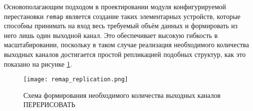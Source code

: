 Основополагающим подходом в проектировании модуля конфигурируемой перестановки \texttt{remap} является создание таких элементарных устройств, которые способны принимать на вход весь требуемый объём данных и формировать из него лишь один выходной канал. Это обеспечивает высокую гибкость в масштабировании, поскольку в таком случае реализация необходимого количества выходных каналов достигается простой репликацией подобных структур, как это показано на рисунке \ref{fig:remap_replication}.\par

\begin{figure}[ht]
    \centering
    \texttt{[image: remap\_replication.png]}
    \caption{Схема формирования необходимого количества выходных каналов ПЕРЕРИСОВАТЬ}
    \label{fig:remap_replication}
\end{figure}\par

